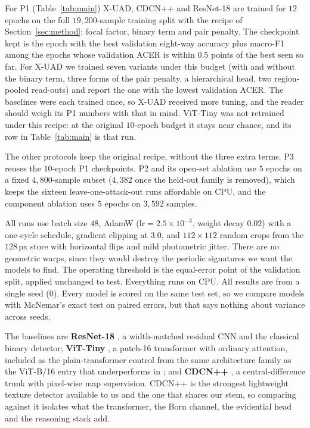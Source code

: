 \documentclass[conference]{IEEEtran}
\begin{document}
For P1 (Table~\ref{tab:main}) X-UAD, CDCN++ and ResNet-18 are trained for $12$
epochs on the full $19{,}200$-sample training split with the recipe of
Section~\ref{sec:method}: focal factor, binary term and pair penalty. The
checkpoint kept is the epoch with the best validation eight-way accuracy plus
macro-F1 among the epochs whose validation ACER is within $0.5$ points of the best
seen so far. For X-UAD we trained seven variants under this budget (with and
without the binary term, three forms of the pair penalty, a hierarchical head, two
region-pooled read-outs) and report the one with
the lowest validation ACER. The baselines were each trained once, so X-UAD
received more tuning, and the reader should weigh its P1 numbers with that in
mind. ViT-Tiny was not retrained under this recipe: at the original $10$-epoch
budget it stays near chance, and its row in Table~\ref{tab:main} is that run.

The other protocols keep the original recipe, without the three extra terms. P3
reuses the $10$-epoch P1 checkpoints. P2 and its open-set ablation use $5$ epochs
on a fixed $4{,}800$-sample subset ($4{,}382$ once the held-out family is removed),
which keeps the sixteen leave-one-attack-out runs affordable on CPU, and the
component ablation uses $5$ epochs on $3{,}592$ samples.

All runs use batch size $48$, AdamW ($\text{lr}=2.5\times10^{-3}$, weight decay
$0.02$) with a one-cycle schedule, gradient clipping at $3.0$, and $112\times112$
random crops from the $128$\,px store with horizontal flips and mild photometric
jitter. There are no geometric warps, since they would destroy the periodic
signatures we want the models to find. The operating threshold is the equal-error
point of the validation split, applied unchanged to test. Everything runs on CPU.
All results are from a single seed (0). Every model is scored on the same test
set, so we compare models with McNemar's exact test on paired errors, but that
says nothing about variance across seeds.

The baselines are \textbf{ResNet-18} \cite{he2016resnet}, a width-matched residual
CNN and the classical binary detector; \textbf{ViT-Tiny} \cite{dosovitskiy2021vit},
a patch-16 transformer with ordinary attention, included as the plain-transformer
control from the same architecture family as the ViT-B/16 entry that underperforms
in \cite{yu2024unified}; and \textbf{CDCN++} \cite{yu2020cdcn,yu2021revisiting}, a
central-difference trunk with pixel-wise map supervision. CDCN++ is the strongest
lightweight texture detector available to us and the one that shares our stem, so
comparing against it isolates what the transformer, the Born channel, the
evidential head and the reasoning stack add.
\end{document}
